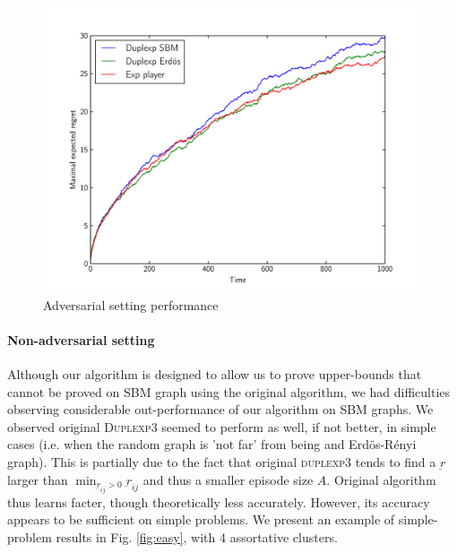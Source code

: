 \documentclass[11pt,a4paper]{article}
\begin{document}
\begin{figure}[ht]
	\centering
	\includegraphics[width=\textwidth]{adversarial}
	\caption{Adversarial setting performance}
	\label{fig:adversarial}
\end{figure}

\paragraph{Non-adversarial setting}Although our algorithm is designed to allow us to prove upper-bounds that cannot be proved on SBM graph using the original algorithm, we had difficulties observing considerable out-performance of our algorithm on SBM graphs. We observed original \textsc{Duplexp3} seemed to perform as well, if not better, in simple cases (i.e. when the random graph is 'not far' from being and Erdös-Rényi graph). This is partially due to the fact that original \textsc{duplexp3} tends to find a $\underbar{r}$ larger than $\min_{\underbar{r}_{ij} >0} \underbar{r}_{ij}$ and thus a smaller episode size $A$. Original algorithm thus learns facter, though theoretically less accurately. However, its accuracy appears to be sufficient on simple problems. We present an example of simple-problem results in Fig. \ref{fig:easy}, with 4 assortative clusters.
\end{document}
